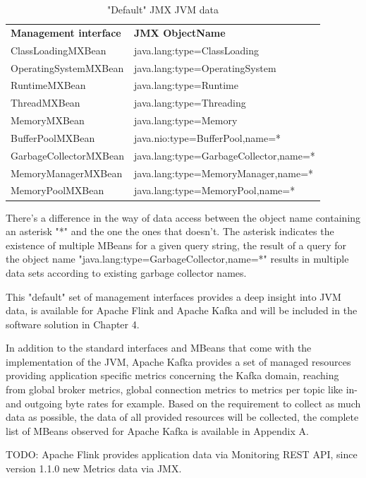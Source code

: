 \begin{table}[H]
    \begin{tabular}{ll}
        \textbf{Management interface} & \textbf{JMX ObjectName} \\
        ClassLoadingMXBean & java.lang:type=ClassLoading \\
        OperatingSystemMXBean & java.lang:type=OperatingSystem \\
        RuntimeMXBean & java.lang:type=Runtime \\
        ThreadMXBean & java.lang:type=Threading \\
        MemoryMXBean & java.lang:type=Memory \\
        BufferPoolMXBean & java.nio:type=BufferPool,name=* \\
        GarbageCollectorMXBean & java.lang:type=GarbageCollector,name=* \\
        MemoryManagerMXBean & java.lang:type=MemoryManager,name=* \\
        MemoryPoolMXBean & java.lang:type=MemoryPool,name=* \\
    \end{tabular}
    \caption{"Default" JMX JVM data}
    \label{tbl:jmxjvmdata}
\end{table}

There's a difference in the way of data access between the object name containing an asterisk "*"
and the one the ones that doesn't. The asterisk indicates the existence of multiple MBeans for a given query string,
the result of a query for the object name "java.lang:type=GarbageCollector,name=*" results in multiple data sets according
to existing garbage collector names.

This "default" set of management interfaces provides a deep insight into JVM data, is
available for Apache Flink and Apache Kafka and will be included in the software solution
in Chapter 4.

In addition to the standard interfaces and MBeans that come with the implementation of the JVM,
Apache Kafka provides a set of managed resources providing application specific
metrics concerning the Kafka domain, reaching from global broker metrics, global connection metrics to
metrics per topic like in- and outgoing byte rates for example. Based on the requirement to collect as
much data as possible, the data of all provided resources will be collected, the complete list of MBeans observed
for Apache Kafka is available in Appendix A.

TODO: Apache Flink provides application data via Monitoring REST API, since version 1.1.0 new Metrics data via JMX.

